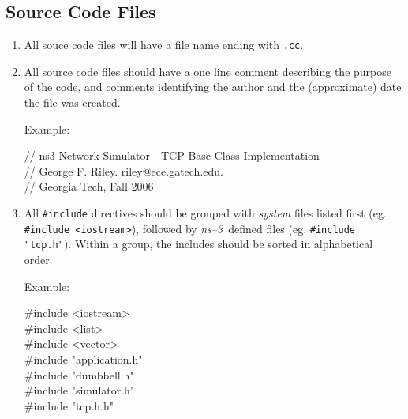 \documentclass[11pt]{article}
\def\nst{{\em ns--3}}
\begin{document}
\subsection{Source Code Files}
\begin{enumerate}
\item All souce code files will have a file name ending with {\tt .cc}.
\item All source code files should have a one line comment describing
the purpose of the code, and comments identifying the
author and the (approximate) date the file was created.

Example:

\begin{tt}
// ns3 Network Simulator - TCP Base Class Implementation \\
// George F. Riley.  riley@ece.gatech.edu. \\
// Georgia Tech, Fall 2006 
\end{tt}

\item All {\tt \#include} directives should be grouped with {\em system}
files listed first (eg. {\tt \#include <iostream>}), followed by
\nst\ defined files (eg. {\tt \#include "tcp.h"}).  Within a group,
the includes should be sorted in alphabetical order.

Example:

\begin{tt}
\#include <iostream> \\
\#include <list> \\
\#include <vector> \\

\#include "application.h" \\
\#include "dumbbell.h" \\
\#include "simulator.h" \\
\#include "tcp.h.h"

\end{tt}
\end{enumerate}
\end{document}
